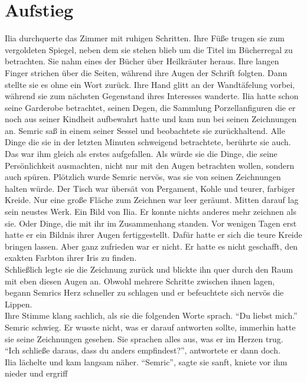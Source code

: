 \chapter{Aufstieg}

Ilia durchquerte das Zimmer mit ruhigen Schritten. Ihre Füße trugen sie zum vergoldeten Spiegel, 
neben dem sie stehen blieb um die Titel im Bücherregal zu betrachten. Sie nahm eines der Bücher 
über Heilkräuter heraus. Ihre langen Finger strichen über die Seiten, während ihre Augen der 
Schrift folgten. Dann stellte sie es ohne ein Wort zurück. Ihre Hand glitt an der Wandtäfelung 
vorbei, während sie zum nächsten Gegenstand ihres Interesses wanderte. Ilia hatte schon 
seine Garderobe betrachtet, seinen Degen, die Sammlung Porzellanfiguren die er noch aus seiner 
Kindheit aufbewahrt hatte und kam nun bei seinen Zeichnungen an. Semric saß in einem seiner Sessel 
und beobachtete sie zurückhaltend. Alle Dinge die sie in der letzten Minuten schweigend 
betrachtete, berührte sie auch. Das war ihm gleich als erstes aufgefallen. Als würde sie die Dinge, 
die seine Persönlichkeit ausmachten, nicht nur mit den Augen betrachten wollen, sondern auch 
spüren. Plötzlich wurde Semric nervös, was sie von seinen Zeichnungen halten würde. Der Tisch war 
übersät von Pergament, Kohle und teurer, farbiger Kreide. Nur eine große Fläche zum Zeichnen war 
leer geräumt. Mitten darauf lag sein neustes Werk. Ein Bild von Ilia. Er konnte nichts anderes 
mehr zeichnen als sie. Oder Dinge, die mit ihr im Zusammenhang standen. Vor wenigen Tagen erst 
hatte er ein Bildnis ihrer Augen fertiggestellt. Dafür hatte er sich die teure Kreide bringen 
lassen. Aber ganz zufrieden war er nicht. Er hatte es nicht geschafft, den exakten Farbton ihrer 
Iris zu finden.\\
Schließlich legte sie die Zeichnung zurück und blickte ihn quer durch den Raum mit eben diesen 
Augen an. Obwohl mehrere Schritte zwischen ihnen lagen, begann Semrics Herz schneller zu schlagen 
und er befeuchtete sich nervös die Lippen.\\
Ihre Stimme klang sachlich, als sie die folgenden Worte sprach. ``Du liebst mich.''\\
Semric schwieg. Er wusste nicht, was er darauf antworten sollte, immerhin hatte sie seine 
Zeichnungen gesehen. Sie sprachen alles aus, was er im Herzen trug.\\
``Ich schließe daraus, dass du anders empfindest?'', antwortete er dann doch.\\
Ilia lächelte und kam langsam näher. ``Semric'', sagte sie sanft, kniete vor ihm nieder und ergriff 
